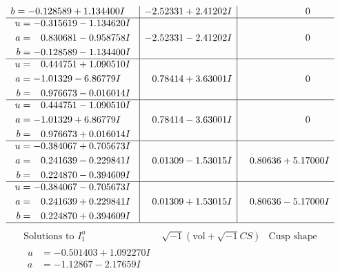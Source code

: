\documentclass[1p]{elsarticle_modified}
\theoremstyle{definition}
\newcommand{\I}{\sqrt{-1}}
\begin{document}
$$\begin{array}{c|c|c}
\begin{aligned}
b &= -0.128589 + 1.134400 I\end{aligned}
 & -2.52331 + 2.41202 I & \phantom{-0.000000 } 0 \\ \hline\begin{aligned}
u &= -0.315619 - 1.134620 I \\
a &= \phantom{-}0.830681 - 0.958758 I \\
b &= -0.128589 - 1.134400 I\end{aligned}
 & -2.52331 - 2.41202 I & \phantom{-0.000000 } 0 \\ \hline\begin{aligned}
u &= \phantom{-}0.444751 + 1.090510 I \\
a &= -1.01329 - 6.86779 I \\
b &= \phantom{-}0.976673 - 0.016014 I\end{aligned}
 & \phantom{-}0.78414 + 3.63001 I & \phantom{-0.000000 } 0 \\ \hline\begin{aligned}
u &= \phantom{-}0.444751 - 1.090510 I \\
a &= -1.01329 + 6.86779 I \\
b &= \phantom{-}0.976673 + 0.016014 I\end{aligned}
 & \phantom{-}0.78414 - 3.63001 I & \phantom{-0.000000 } 0 \\ \hline\begin{aligned}
u &= -0.384067 + 0.705673 I \\
a &= \phantom{-}0.241639 - 0.229841 I \\
b &= \phantom{-}0.224870 - 0.394609 I\end{aligned}
 & \phantom{-}0.01309 - 1.53015 I & \phantom{-}0.80636 + 5.17000 I \\ \hline\begin{aligned}
u &= -0.384067 - 0.705673 I \\
a &= \phantom{-}0.241639 + 0.229841 I \\
b &= \phantom{-}0.224870 + 0.394609 I\end{aligned}
 & \phantom{-}0.01309 + 1.53015 I & \phantom{-}0.80636 - 5.17000 I\\
 \hline 
 \end{array}$$\newpage$$\begin{array}{c|c|c}  
\text{Solutions to }I^u_{1}& \I (\text{vol} + \sqrt{-1}CS) & \text{Cusp shape}\\
 \hline 
\begin{aligned}
u &= -0.501403 + 1.092270 I \\
a &= -1.12867 - 2.17659 I \\

\end{aligned}
\end{array}$$
\end{document}

